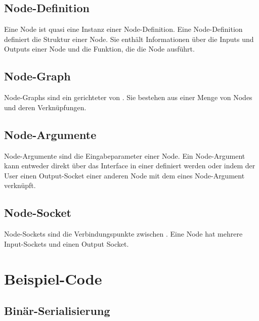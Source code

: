 \documentclass[ngerman]{article}
\begin{document}
\subsection{Node-Definition}
\label{sec:node_definition}
Eine Node ist quasi eine Instanz einer Node-Definition. Eine Node-Definition definiert die Struktur einer Node. Sie enthält Informationen über die Inputs und Outputs einer Node und die Funktion, die die Node ausführt.

\subsection{Node-Graph}
\label{sec:node_graph}
Node-Graphs sind ein gerichteter  von . Sie bestehen aus einer Menge von Nodes und deren Verknüpfungen. 

\subsection{Node-Argumente}
\label{sec:node_argumente}
Node-Argumente sind die Eingabeparameter einer Node. Ein Node-Argument kann entweder direkt über das Interface in einer  definiert werden oder indem der User einen Output-Socket einer anderen Node mit dem  eines Node-Argument verknüpft.

\subsection{Node-Socket}
\label{sec:node_socket}
Node-Sockets sind die Verbindungspunkte zwischen . Eine Node hat mehrere Input-Sockets und einen Output Socket.

\pagebreak

\section{Beispiel-Code}
\subsection{Binär-Serialisierung}
\label{sec:code_nested_encoding}
\end{document}
